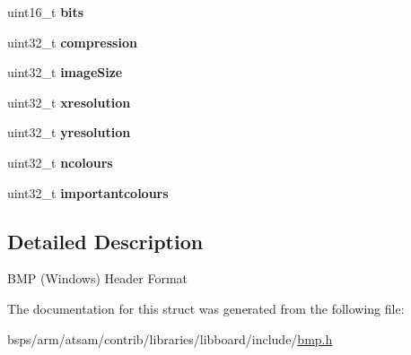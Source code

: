 \begin{DoxyCompactItemize}
\item 
\mbox{\label{struct__BMPHeader_a7bf83d06592a3ed79e3072400ce37892}} 
uint16\+\_\+t {\bfseries bits}
\item 
\mbox{\label{struct__BMPHeader_ae25c20e4b1de49423b84f8f96f9ee4a0}} 
uint32\+\_\+t {\bfseries compression}
\item 
\mbox{\label{struct__BMPHeader_a8a7d9aa819e4c440d008437a856ceeee}} 
uint32\+\_\+t {\bfseries image\+Size}
\item 
\mbox{\label{struct__BMPHeader_ae5f10a6614ab7d1c1ebc2d42c0c0c690}} 
uint32\+\_\+t {\bfseries xresolution}
\item 
\mbox{\label{struct__BMPHeader_a480535e569fe7850c75f9fafa917b0f2}} 
uint32\+\_\+t {\bfseries yresolution}
\item 
\mbox{\label{struct__BMPHeader_a1f334b91eac9989b21eeccc5a950736d}} 
uint32\+\_\+t {\bfseries ncolours}
\item 
\mbox{\label{struct__BMPHeader_a05f6ed5499431dd124a09665ccfb4357}} 
uint32\+\_\+t {\bfseries importantcolours}
\end{DoxyCompactItemize}


\subsection{Detailed Description}
B\+MP (Windows) Header Format 

The documentation for this struct was generated from the following file\+:\begin{DoxyCompactItemize}
\item 
bsps/arm/atsam/contrib/libraries/libboard/include/\mbox{\hyperlink{bmp_8h}{bmp.\+h}}\end{DoxyCompactItemize}
